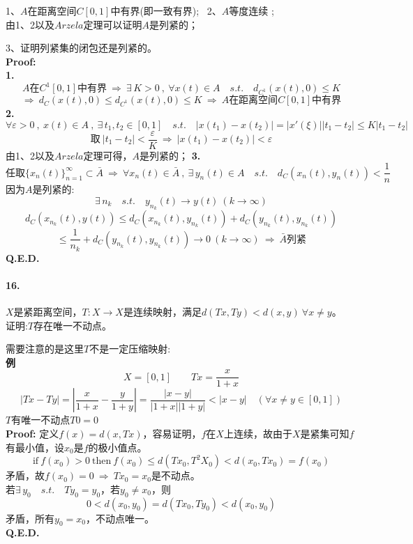 1、$A$在距离空间$C[0,1]$中有界(即一致有界); \ 2、$A$等度连续 ;\\
由1、2以及$Arzela$定理可以证明$A$是列紧的；

3、证明列紧集的闭包还是列紧的。\\
\textbf{Proof:}\\
\textbf{1.}
\[A\text{在}C^1[0,1]\text{中有界} \ \Rightarrow \ \exists \, K>0 \ , \ \forall x(t) \in A \quad s.t. \quad d_{C^1}(x(t),0) \leq K\]
\[\Rightarrow \ d_C(x(t),0) \leq d_{C^1}(x(t),0) \leq K \ \Rightarrow \ \text{$A$在距离空间$C[0,1]$中有界}\]
\textbf{2.}
\[\forall \varepsilon>0 \ , \ x(t) \in A \ , \ \exists \, t_1,t_2 \in [0,1] \quad s.t. \quad |x(t_1)-x(t_2)|=|x'(\xi)||t_1-t_2| \leq K|t_1-t_2|\]
\[\text{取} \ |t_1-t_2|<\frac{\varepsilon}{K} \ \Rightarrow \ |x(t_1)-x(t_2)|<\varepsilon\]
由1、2以及$Arzela$定理可得，$A$是列紧的；
\textbf{3.}
\[\text{任取}\{x_n(t)\}_{n=1}^{\infty} \subset \bar{A} \ \Rightarrow \ \forall x_n(t) \in \bar{A} \ , \ \exists \, y_n(t) \in A \quad s.t. \quad d_C(x_n(t),y_n(t))<\frac{1}{n}\]
因为$A$是列紧的:
\[\exists \, n_k \quad s.t. \quad y_{n_k}(t) \to y(t) \ (k \to \infty)\]
\[d_C(x_{n_k}(t),y(t)) \leq d_C(x_{n_k}(t),y_{n_k}(t))+d_C(y_{n_k}(t),y_{n_k}(t))\]
\[\leq \frac{1}{n_k}+d_C(y_{n_k}(t),y_{n_k}(t)) \to 0 \ (k \to \infty) \ \Rightarrow \ \bar{A}\text{列紧}\]
\textbf{Q.E.D.}

\paragraph*{16.}$X$是紧距离空间，$T:X \to X$是连续映射，满足$d(Tx,Ty)<d(x,y) \ \forall x \neq y$。\\
证明:$T$存在唯一不动点。

需要注意的是这里$T$不是一定压缩映射:\\
\textbf{例}
\[X=[0,1] \qquad Tx=\frac{x}{1+x}\]
\[|Tx-Ty|=\left|\frac{x}{1+x}-\frac{y}{1+y}\right|=\frac{|x-y|}{|1+x||1+y|}<|x-y| \quad (\forall x \neq y \in [0,1])\]
$T$有唯一不动点$T0=0$\\
\textbf{Proof:} 定义$f(x)=d(x,Tx)$，容易证明，$f$在$X$上连续，故由于$X$是紧集可知$f$有最小值，设$x_0$是$f$的极小值点。
\[\text{if} \ f(x_0)>0 \ \text{then} \ f(x_0) \leq d(Tx_0,T^2X_0)<d(x_0,Tx_0)=f(x_0)\]
矛盾，故$f(x_0)=0 \ \Rightarrow \ Tx_0=x_0$是不动点。\\
若$\exists \, y_0 \quad s.t. \quad Ty_0=y_0$，若$y_0 \neq x_0$，则
\[0<d(x_0,y_0)=d(Tx_0,Ty_0)<d(x_0,y_0)\]
矛盾，所有$y_0=x_0$，不动点唯一。\\
\textbf{Q.E.D.}

